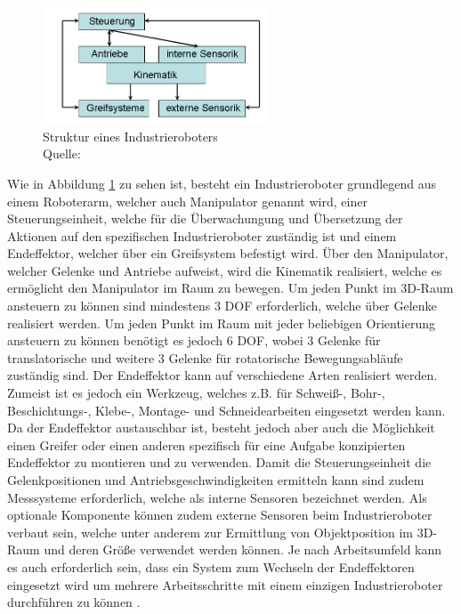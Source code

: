 \begin{figure}[htb]
	\centering
	\includegraphics[width=0.6\textwidth]{images/stand_der_technik/Struktur_IR}
	\caption[Struktur eines Industrieroboters]{Struktur eines Industrieroboters \\Quelle: \cite{noauthor_industrieroboter_2020}}
	\label{fig:struktur_eines_industrieroboters}
\end{figure}
\FloatBarrier

Wie in Abbildung \ref{fig:struktur_eines_industrieroboters} zu sehen ist, besteht ein Industrieroboter grundlegend aus einem Roboterarm, welcher auch Manipulator genannt wird, einer Steuerungseinheit, welche für die Überwachungung und Übersetzung der Aktionen auf den spezifischen Industrieroboter zuständig ist und einem Endeffektor, welcher über ein Greifsystem befestigt wird. Über den Manipulator, welcher Gelenke und Antriebe aufweist, wird die Kinematik realisiert, welche es ermöglicht den Manipulator im Raum zu bewegen. Um jeden Punkt im 3D-Raum ansteuern zu können sind mindestens 3 DOF erforderlich, welche über Gelenke realisiert werden. Um jeden Punkt im Raum mit jeder beliebigen Orientierung ansteuern zu können benötigt es jedoch 6 DOF, wobei 3 Gelenke für translatorische und weitere 3 Gelenke für rotatorische Bewegungsabläufe zuständig sind. Der Endeffektor kann auf verschiedene Arten realisiert werden. Zumeist ist es jedoch ein Werkzeug, welches z.B. für Schweiß-, Bohr-, Beschichtungs-, Klebe-, Montage- und Schneidearbeiten eingesetzt werden kann. Da der Endeffektor austauschbar ist, besteht jedoch aber auch die Möglichkeit einen Greifer oder einen anderen spezifisch für eine Aufgabe konzipierten Endeffektor zu montieren und zu verwenden. Damit die Steuerungseinheit die Gelenkpositionen und Antriebsgeschwindigkeiten ermitteln kann sind zudem Messsysteme erforderlich, welche als interne Sensoren bezeichnet werden. Als optionale Komponente können zudem externe Sensoren beim Industrieroboter verbaut sein, welche unter anderem zur Ermittlung von Objektposition im 3D-Raum und deren Größe verwendet werden können. Je nach Arbeitsumfeld kann es auch erforderlich sein, dass ein System zum Wechseln der Endeffektoren eingesetzt wird um mehrere Arbeitsschritte mit einem einzigen Industrieroboter durchführen zu können \cite{hagele_aufbau_2006}.

